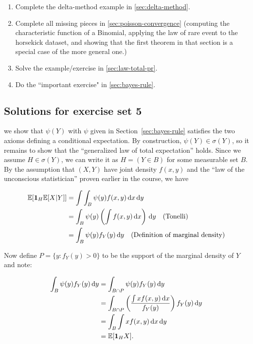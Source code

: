 \documentclass{article}
\begin{document}
\begin{enumerate}	
	\item Complete the delta-method example in \ref{sec:delta-method}. 
	\item Complete all missing pieces in \ref{sec:poisson-convergence} (computing the characteristic function of a Binomial, applying the law of rare event to the horsekick dataset, and showing that the first theorem in that section is a special case of the more general one.)
	\item Solve the example/exercise in \ref{sec:law-total-pr}.
	\item Do the ``important exercise" in \ref{sec:bayes-rule}.
\end{enumerate}

\subsection{Solutions for exercise set 5} 

 we show that $\psi(Y)$ with $\psi$ given in Section~\ref{sec:bayes-rule} satisfies the two axioms defining a conditional expectation. By construction, $\psi(Y) \in \sigma(Y)$, so it remains to show that the ``generalized law of total expectation'' holds. Since we assume $H \in \sigma(Y)$, we can write it as $H = (Y \in B)$ for some measurable set $B$. By the assumption that $(X, Y)$ have joint density $f(x, y)$ and the ``law of the unconscious statistician'' proven earlier in the course, we have

\begin{align*} 
{\mathbb E}[{\mathbf 1}_H {\mathbb E}[X | Y]] &= \int \int_B \psi(y) f(x, y) \,\mathrm{d} x \,\mathrm{d}  y \\ 
&=   \int_B \psi(y) \left( \int  f(x, y) \,\mathrm{d} x \right) \,\mathrm{d}  y \quad \text{(Tonelli)} \\ 
&= \int_B \psi(y) f_Y(y) \,\mathrm{d}  y \quad \text{(Definition of marginal density)} 
\end{align*}

Now define $P = \{ y : f_Y(y) > 0\}$ to be the support of the marginal density of $Y$ and note:

\begin{align*} 
	 \int_B \psi(y) f_Y(y) \,\mathrm{d}  y &=  \int_{B \cap P} \psi(y) f_Y(y) \,\mathrm{d}  y \\
	 &=  \int_{B \cap P} \left( \frac{\int x f(x, y) \,\mathrm{d} x}{f_Y(y)} \right) f_Y(y) \,\mathrm{d}  y \\
	 &=  \int_{B}  \int x f(x, y) \,\mathrm{d} x \,\mathrm{d}  y \\
	 &= {\mathbb E}[ {\mathbf 1}_H X]. 
\end{align*}
\end{document}
